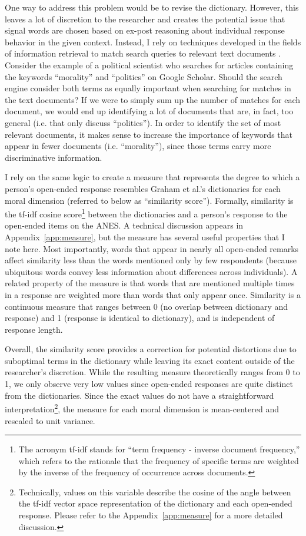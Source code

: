 \documentclass[12pt]{article}
\begin{document}
One way to address this problem would be to revise the dictionary. However, this leaves a lot of discretion to the researcher and creates the potential issue that signal words are chosen based on ex-post reasoning about individual response behavior in the given context. Instead, I rely on techniques developed in the fields of information retrieval to match search queries to relevant text documents \citep[see][for an introduction]{manning2008introduction}. Consider the example of a political scientist who searches for articles containing the keywords ``morality'' and ``politics'' on Google Scholar. Should the search engine consider both terms as equally important when searching for matches in the text documents? If we were to simply sum up the number of matches for each document, we would end up identifying a lot of documents that are, in fact, too general (i.e. that only discuss ``politics''). In order to identify the set of most relevant documents, it makes sense to increase the importance of keywords that appear in fewer documents (i.e. ``morality''), since those terms carry more discriminative information.

I rely on the same logic to create a measure that represents the degree to which a person's open-ended response resembles Graham et al.'s \citeyearpar{graham2009liberals} dictionaries for each moral dimension (referred to below as ``similarity score''). Formally, similarity is the tf-idf cosine score\footnote{The acronym tf-idf stands for ``term frequency - inverse document frequency,'' which refers to the rationale that the frequency of specific terms are weighted by the inverse of the frequency of occurrence across documents.} between the dictionaries and a person's response to the open-ended items on the ANES. A technical discussion appears in Appendix~\ref{app:measure}, but the measure has several useful properties that I note here. Most importantly, words that appear in nearly all open-ended remarks affect similarity less than the words mentioned only by few respondents (because ubiquitous words convey less information about differences across individuals). A related property of the measure is that words that are mentioned multiple times in a response are weighted more than words that only appear once. Similarity is a continuous measure that ranges between 0 (no overlap between dictionary and response) and 1 (response is identical to dictionary), and is independent of response length.

Overall, the similarity score provides a correction for potential distortions due to suboptimal terms in the dictionary while leaving its exact content outside of the researcher's discretion. While the resulting measure theoretically ranges from 0 to 1, we only observe very low values since open-ended responses are quite distinct from the dictionaries. Since the exact values do not have a straightforward interpretation\footnote{Technically, values on this variable describe the cosine of the angle between the tf-idf vector space representation of the dictionary and each open-ended response. Please refer to the Appendix~\ref{app:measure} for a more detailed discussion.}, the measure for each moral dimension is mean-centered and rescaled to unit variance.
\end{document}
